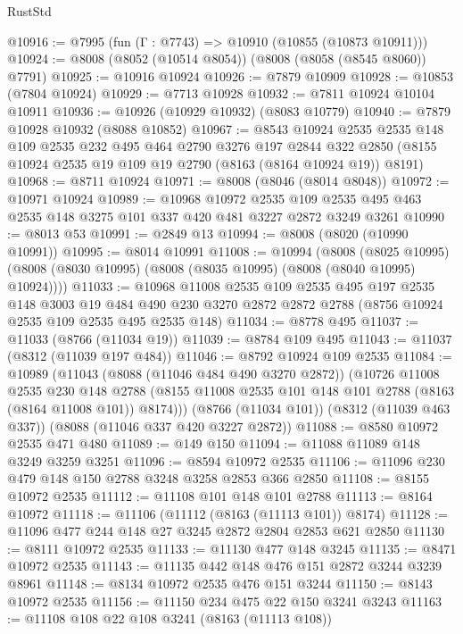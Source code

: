 \begin{lexlean}{RustStd}
\begin{coremodule}
@10916 := @7995 (fun (Γ : @7743) => @10910 (@10855 (@10873 @10911)))
@10924 := @8008 (@8052 (@10514 @8054)) (@8008 (@8058 (@8545 @8060)) @7791)
@10925 := @10916 @10924
@10926 := @7879 @10909
@10928 := @10853 (@7804 @10924)
@10929 := @7713 @10928
@10932 := @7811 @10924 @10104 @10911
@10936 := @10926 (@10929 @10932) (@8083 @10779)
@10940 := @7879 @10928 @10932 (@8088 @10852)
@10967 := @8543
    @10924
    @2535
    @2535
    @148
    @109
    @2535
    @232
    @495
    @464
    @2790
    @3276
    @197
    @2844
    @322
    @2850
    (@8155 @10924 @2535 @19 @109 @19 @2790 (@8163 (@8164 @10924 @19)) @8191)
@10968 := @8711 @10924
@10971 := @8008 (@8046 (@8014 @8048))
@10972 := @10971 @10924
@10989 := @10968
    @10972
    @2535
    @109
    @2535
    @495
    @463
    @2535
    @148
    @3275
    @101
    @337
    @420
    @481
    @3227
    @2872
    @3249
    @3261
@10990 := @8013 @53
@10991 := @2849 @13
@10994 := @8008 (@8020 (@10990 @10991))
@10995 := @8014 @10991
@11008 := @10994
    (@8008
      (@8025 @10995)
      (@8008 (@8030 @10995) (@8008 (@8035 @10995) (@8008 (@8040 @10995) @10924))))
@11033 := @10968
    @11008
    @2535
    @109
    @2535
    @495
    @197
    @2535
    @148
    @3003
    @19
    @484
    @490
    @230
    @3270
    @2872
    @2872
    @2788
    (@8756 @10924 @2535 @109 @2535 @495 @2535 @148)
@11034 := @8778 @495
@11037 := @11033 (@8766 (@11034 @19))
@11039 := @8784 @109 @495
@11043 := @11037 (@8312 (@11039 @197 @484))
@11046 := @8792 @10924 @109 @2535
@11084 := @10989
    (@11043
      (@8088 (@11046 @484 @490 @3270 @2872))
      (@10726
        @11008
        @2535
        @230
        @148
        @2788
        (@8155 @11008 @2535 @101 @148 @101 @2788 (@8163 (@8164 @11008 @101)) @8174)))
    (@8766 (@11034 @101))
    (@8312 (@11039 @463 @337))
    (@8088 (@11046 @337 @420 @3227 @2872))
@11088 := @8580 @10972 @2535 @471 @480
@11089 := @149 @150
@11094 := @11088 @11089 @148 @3249 @3259 @3251
@11096 := @8594 @10972 @2535
@11106 := @11096 @230 @479 @148 @150 @2788 @3248 @3258 @2853 @366 @2850
@11108 := @8155 @10972 @2535
@11112 := @11108 @101 @148 @101 @2788
@11113 := @8164 @10972
@11118 := @11106 (@11112 (@8163 (@11113 @101)) @8174)
@11128 := @11096 @477 @244 @148 @27 @3245 @2872 @2804 @2853 @621 @2850
@11130 := @8111 @10972 @2535
@11133 := @11130 @477 @148 @3245
@11135 := @8471 @10972 @2535
@11143 := @11135 @442 @148 @476 @151 @2872 @3244 @3239 @8961
@11148 := @8134 @10972 @2535 @476 @151 @3244
@11150 := @8143 @10972 @2535
@11156 := @11150 @234 @475 @22 @150 @3241 @3243
@11163 := @11108 @108 @22 @108 @3241 (@8163 (@11113 @108))

\end{coremodule}
\end{lexlean}
